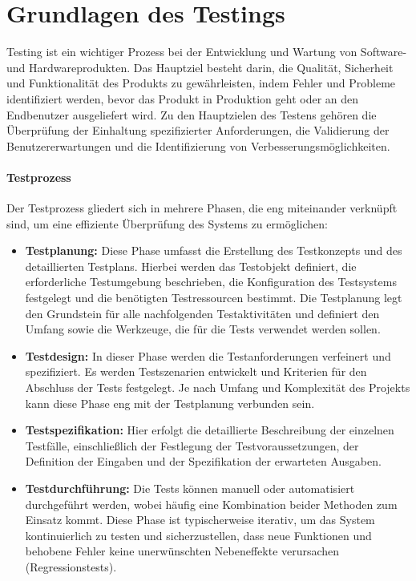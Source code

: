 \section{Grundlagen des Testings}

Testing ist ein wichtiger Prozess bei der Entwicklung und Wartung von Software- und Hardwareprodukten. Das Hauptziel besteht darin, die Qualität, Sicherheit und 
Funktionalität des Produkts zu gewährleisten, indem Fehler und Probleme identifiziert werden, bevor das Produkt in Produktion geht oder an den Endbenutzer ausgeliefert wird. 
Zu den Hauptzielen des Testens gehören die Überprüfung der Einhaltung spezifizierter Anforderungen, die Validierung der Benutzererwartungen und die Identifizierung von 
Verbesserungsmöglichkeiten.

\paragraph{Testprozess}

Der Testprozess gliedert sich in mehrere Phasen, die eng miteinander verknüpft sind, um eine effiziente Überprüfung des Systems zu ermöglichen:

\begin{itemize}
    \item \textbf{Testplanung:} Diese Phase umfasst die Erstellung des Testkonzepts und des detaillierten Testplans. Hierbei werden das Testobjekt definiert, die erforderliche Testumgebung beschrieben, die Konfiguration des Testsystems festgelegt und die benötigten Testressourcen bestimmt. Die Testplanung legt den Grundstein für alle nachfolgenden Testaktivitäten und definiert den Umfang sowie die Werkzeuge, die für die Tests verwendet werden sollen.
    \item \textbf{Testdesign:} In dieser Phase werden die Testanforderungen verfeinert und spezifiziert. Es werden Testszenarien entwickelt und Kriterien für den Abschluss der Tests festgelegt. Je nach Umfang und Komplexität des Projekts kann diese Phase eng mit der Testplanung verbunden sein.
    \item \textbf{Testspezifikation:} Hier erfolgt die detaillierte Beschreibung der einzelnen Testfälle, einschließlich der Festlegung der Testvoraussetzungen, der Definition der Eingaben und der Spezifikation der erwarteten Ausgaben.
    \item \textbf{Testdurchführung:} Die Tests können manuell oder automatisiert durchgeführt werden, wobei häufig eine Kombination beider Methoden zum Einsatz kommt. Diese Phase ist typischerweise iterativ, um das System kontinuierlich zu testen und sicherzustellen, dass neue Funktionen und behobene Fehler keine unerwünschten Nebeneffekte verursachen (Regressionstests).
\end{itemize}

